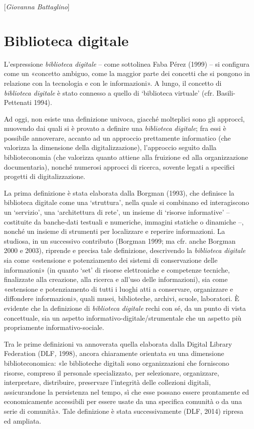 \hrulefill 

{[}\emph{Giovanna Battaglino}{]}

\chapter{Biblioteca digitale}

L'espressione \emph{biblioteca digitale} -- come sottolinea Faba Pérez
(1999) -- si configura come un «concetto ambiguo, come la maggior parte
dei concetti che si pongono in relazione con la tecnologia e con le
informazioni». A lungo, il concetto di \emph{biblioteca digitale} è
stato connesso a quello di `biblioteca virtuale' (cfr. Basili-Pettenati
1994).

Ad oggi, non esiste una definizione univoca, giacché molteplici sono gli
approccî, muovendo dai quali si è provato a definire una
\emph{biblioteca digitale}; fra essi è possibile annoverare, accanto ad
un approccio prettamente informatico (che valorizza la dimensione della
digitalizzazione), l'approccio seguìto dalla biblioteconomia (che
valorizza quanto attiene alla fruizione ed alla organizzazione
documentaria), nonché numerosi approcci di ricerca, sovente legati a
specifici progetti di digitalizzazione.

La prima definizione è stata elaborata dalla Borgman (1993), che
definisce la biblioteca digitale come una `struttura', nella quale si
combinano ed interagiscono un `servizio', una `architettura di rete', un
insieme di `risorse informative' -- costituite da banche-dati testuali e
numeriche, immagini statiche o dinamiche --, nonché un insieme di
strumenti per localizzare e reperire informazioni. La studiosa, in un
successivo contributo (Borgman 1999; ma cfr. anche Borgman 2000 e 2003),
riprende e precisa tale definizione, descrivendo la \emph{biblioteca
digitale} sia come «estensione e potenziamento dei sistemi di
conservazione delle informazioni» (in quanto `set' di risorse
elettroniche e competenze tecniche, finalizzate alla creazione, alla
ricerca e all'uso delle informazioni), sia come «estensione e
potenziamento di tutti i luoghi atti a conservare, organizzare e
diffondere informazioni», quali musei, biblioteche, archivi, scuole,
laboratori. È evidente che la definizione di \emph{biblioteca digitale}
rechi con sé, da un punto di vista concettuale, sia un aspetto
informativo-digitale/strumentale che un aspetto più propriamente
informativo-sociale.

Tra le prime definizioni va annoverata quella elaborata dalla Digital
Library Federation (DLF\emph{,} 1998), ancora chiaramente orientata su
una dimensione biblioteconomica: «le biblioteche digitali sono
organizzazioni che forniscono risorse, compreso il personale
specializzato, per selezionare, organizzare, interpretare, distribuire,
preservare l'integrità delle collezioni digitali, assicurandone la
persistenza nel tempo, sì che esse possano essere prontamente ed
economicamente accessibili per essere usate da una specifica comunità o
da una serie di comunità». Tale definizione è stata successivamente
(DLF, 2014) ripresa ed ampliata.

